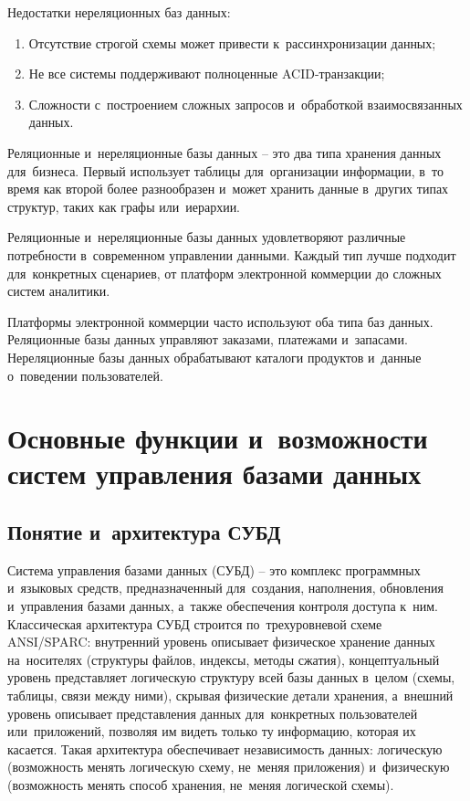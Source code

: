 \documentclass{ou}
\begin{document}
Недостатки нереляционных баз данных:
\begin{enumerate}[itemindent=4em, nosep, label=\arabic*)]
\item Отсутствие строгой схемы может привести к~рассинхронизации данных;
\item Не все системы поддерживают полноценные ACID-транзакции;
\item Сложности с~построением сложных запросов и~обработкой взаимосвязанных данных.
\end{enumerate}

Реляционные и~нереляционные базы данных -- это два типа хранения данных для~бизнеса. Первый использует таблицы для~организации информации, в~то время как второй более разнообразен и~может хранить данные в~других типах структур, таких как графы или~иерархии.

Реляционные и~нереляционные базы данных удовлетворяют различные потребности в~современном управлении данными. Каждый тип лучше подходит для~конкретных сценариев, от платформ электронной коммерции до сложных систем аналитики.

Платформы электронной коммерции часто используют оба типа баз данных. Реляционные базы данных управляют заказами, платежами и~запасами. Нереляционные базы данных обрабатывают каталоги продуктов и~данные о~поведении пользователей.
\newpage
\section{Основные функции и~возможности систем управления базами данных}
\subsection{Понятие и~архитектура СУБД}
Система управления базами данных (СУБД) -- это комплекс программных и~языковых средств, предназначенный для~создания, наполнения, обновления и~управления базами данных, а~также обеспечения контроля доступа к~ним. Классическая архитектура СУБД строится по~трехуровневой схеме ANSI/SPARC: внутренний уровень описывает физическое хранение данных на~носителях (структуры файлов, индексы, методы сжатия), концептуальный уровень представляет логическую структуру всей базы данных в~целом (схемы, таблицы, связи между ними), скрывая физические детали хранения, а~внешний уровень описывает представления данных для~конкретных пользователей или~приложений, позволяя им видеть только ту информацию, которая их касается. Такая архитектура обеспечивает независимость данных: логическую (возможность менять логическую схему, не~меняя приложения) и~физическую (возможность менять способ хранения, не~меняя логической схемы).
\end{document}
